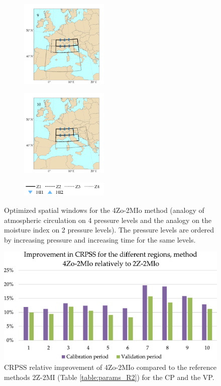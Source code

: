 \documentclass[5p]{elsarticle}
\begin{document}
\begin{figure}[htb]
\begin{subfigure}{.5\columnwidth}
	\end{subfigure}
	\begin{subfigure}{.5\columnwidth}
		\centering
		\includegraphics[width=4.2cm]{figures/spatial_win_z4-hi2/Spatial_windows_9.png}
	\end{subfigure}%
	\begin{subfigure}{.5\columnwidth}
		\centering
		\includegraphics[width=4.2cm]{figures/spatial_win_z4-hi2/Spatial_windows_10.png}
	\end{subfigure}
	\begin{subfigure}{.5\columnwidth}
		\centering
		\includegraphics[width=4.2cm]{figures/spatial_win_z4-hi2/legend.png}
	\end{subfigure}
	\caption{Optimized spatial windows for the 4Zo-2MIo method (analogy of atmospheric circulation on 4 pressure levels and the analogy on the moisture index on 2 pressure levels). The pressure levels are ordered by increasing pressure and increasing time for the same levels.}
	\label{fig:spatial_windows_4Zo-2MIo}
\end{figure}

\begin{figure}[htb]
	\centerline{\includegraphics[width=\linewidth]{figures/figure_dcrpss_4Zo-2HIo.pdf}}
	\caption{CRPSS relative improvement of 4Zo-2MIo compared to the reference methods 2Z-2MI (Table \ref{table:params_R2}) for the CP and the VP.}
	\label{fig:figure_dcrpss_4Zo-2HIo}
\end{figure}
\end{document}
